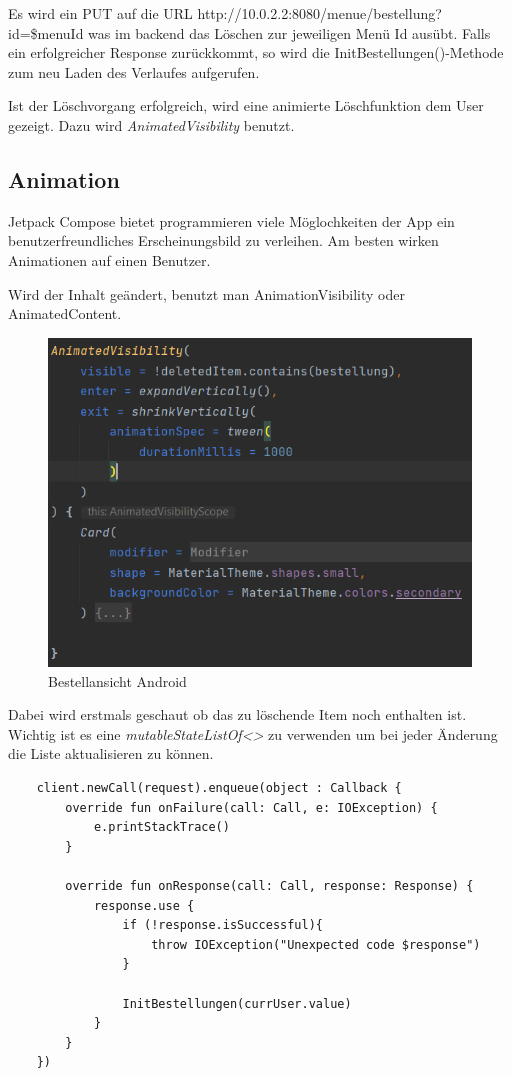 Es wird ein PUT auf die URL http://10.0.2.2:8080/menue/bestellung?id=\$menuId was im backend das Löschen zur jeweiligen Menü Id ausübt.
Falls ein erfolgreicher Response zurückkommt, so wird die InitBestellungen()-Methode zum neu Laden des Verlaufes aufgerufen.

Ist der Löschvorgang erfolgreich, wird eine animierte Löschfunktion dem User gezeigt. Dazu wird \textit{AnimatedVisibility} benutzt.

\subsection{Animation}
Jetpack Compose bietet programmieren viele Möglochkeiten der App ein benutzerfreundliches Erscheinungsbild zu verleihen.
Am besten wirken Animationen auf einen Benutzer. 

Wird der Inhalt geändert, benutzt man AnimationVisibility oder AnimatedContent.
\begin{figure}[htp]
    \centering
    \author{Bozidar Spasenovic}
    \includegraphics[scale=1]{pics/AnimationVisibility.PNG}
    \caption{Bestellansicht Android}
    \label{fig:impl:BestellübersichtAndroid}
\end{figure}
Dabei wird erstmals geschaut ob das zu löschende Item noch enthalten ist.
 Wichtig ist es eine \textit{mutableStateListOf<>} zu verwenden um bei jeder Änderung die Liste aktualisieren zu können.


\begin{lstlisting}
    client.newCall(request).enqueue(object : Callback {
        override fun onFailure(call: Call, e: IOException) {
            e.printStackTrace()
        }

        override fun onResponse(call: Call, response: Response) {
            response.use {
                if (!response.isSuccessful){
                    throw IOException("Unexpected code $response")
                }

                InitBestellungen(currUser.value)
            }
        }
    })
\end{lstlisting}


